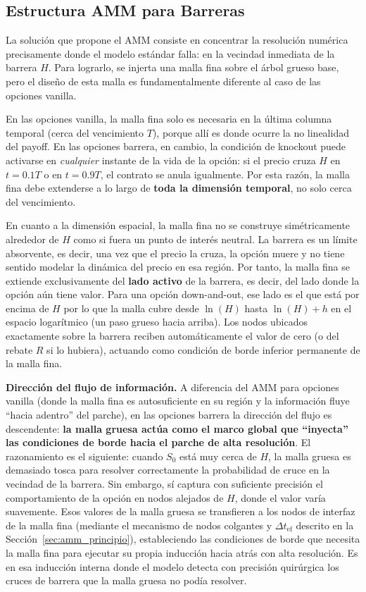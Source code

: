 \subsection{Estructura AMM para Barreras}

La solución que propone el AMM consiste en concentrar la resolución numérica precisamente donde el modelo estándar falla: en la vecindad inmediata de la barrera $H$. Para lograrlo, se injerta una malla fina sobre el árbol grueso base, pero el diseño de esta malla es fundamentalmente diferente al caso de las opciones vanilla.

En las opciones vanilla, la malla fina solo es necesaria en la última columna temporal (cerca del vencimiento $T$), porque allí es donde ocurre la no linealidad del payoff. En las opciones barrera, en cambio, la condición de knockout puede activarse en \textit{cualquier} instante de la vida de la opción: si el precio cruza $H$ en $t=0.1T$ o en $t=0.9T$, el contrato se anula igualmente. Por esta razón, la malla fina debe extenderse a lo largo de \textbf{toda la dimensión temporal}, no solo cerca del vencimiento.

En cuanto a la dimensión espacial, la malla fina no se construye simétricamente alrededor de $H$ como si fuera un punto de interés neutral. La barrera es un límite absorvente, es decir, una vez que el precio la cruza, la opción muere y no tiene sentido modelar la dinámica del precio en esa región. Por tanto, la malla fina se extiende exclusivamente del \textbf{lado activo} de la barrera, es decir, del lado donde la opción aún tiene valor. Para una opción down-and-out, ese lado es el que está por encima de $H$ por lo que la malla cubre desde $\ln(H)$ hasta $\ln(H) + h$ en el espacio logarítmico (un paso grueso hacia arriba). Los nodos ubicados exactamente sobre la barrera reciben automáticamente el valor de cero (o del rebate $R$ si lo hubiera), actuando como condición de borde inferior permanente de la malla fina.

\textbf{Dirección del flujo de información.} A diferencia del AMM para opciones vanilla (donde la malla fina es autosuficiente en su región y la información fluye ``hacia adentro'' del parche), en las opciones barrera la dirección del flujo es descendente: \textbf{la malla gruesa actúa como el marco global que ``inyecta'' las condiciones de borde hacia el parche de alta resolución}. El razonamiento es el siguiente: cuando $S_0$ está muy cerca de $H$, la malla gruesa es demasiado tosca para resolver correctamente la probabilidad de cruce en la vecindad de la barrera. Sin embargo, sí captura con suficiente precisión el comportamiento de la opción en nodos alejados de $H$, donde el valor varía suavemente. Esos valores de la malla gruesa se transfieren a los nodos de interfaz de la malla fina (mediante el mecanismo de nodos colgantes y $\Delta t_{\mbox{ef}}$ descrito en la Sección~\ref{sec:amm_principio}), estableciendo las condiciones de borde que necesita la malla fina para ejecutar su propia inducción hacia atrás con alta resolución. Es en esa inducción interna donde el modelo detecta con precisión quirúrgica los cruces de barrera que la malla gruesa no podía resolver.

